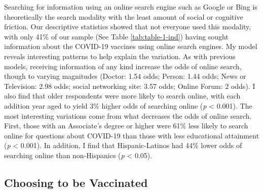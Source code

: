 Searching for information using an online search engine such as Google or Bing
is theoretically the search modality with the least amount of social or
cognitive friction. Our descriptive statistics showed that not everyone used
this modality, with only 41\% of our sample (See Table \ref{tab:table-1-ind})
having sought information about the COVID-19 vaccines using online search
engines. My model reveals interesting patterns to help explain the variation. As
with previous models, receiving information of any kind increase the odds of
online search, though to varying magnitudes (Doctor: 1.54 odds; Person: 1.44
odds; News or Television: 2.98 odds; social networking site: 3.57 odds; Online
Forum: 2 odds). I also find that older respondents were more likely to search
online, with each addition year aged to yield 3\% higher odds of searching
online (\emph{p} \textless{} 0.001). The most interesting variations come from
what decreases the odds of online search. First, those with an Associate's
degree or higher were 61\% less likely to search online for questions about
COVID-19 than those with less educational attainment (\emph{p} \textless{}
0.001). In addition, I find that Hispanic-Latinos had 44\% lower odds of
searching online than non-Hispanics (\emph{p} \textless{} 0.05).

\hypertarget{vaccination-views}{\subsection{Choosing to be Vaccinated}\label{vaccination-views}}




